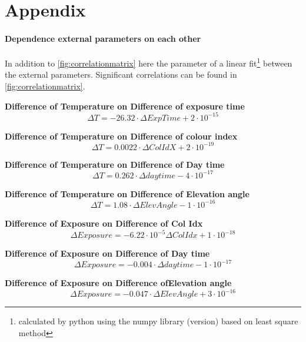 \documentclass  [
  paper    = a4,
  BCOR     = 10mm,
  twoside,
  fontsize = 12pt,
  fleqn,
  toc      = bibnumbered,
  toc      = listofnumbered,
  numbers  = noendperiod,
  headings = normal,
  listof   = leveldown,
  version  = 3.03
]                                       {scrreprt}
\begin{document}
\part{Appendix}
\begin{appendix}
	\subsection*{Dependence external parameters on each other}
	In addition to \cref{fig:correlationmatrix} here the parameter of a linear fit\footnote{calculated by python using the numpy library (version) based on least square method} between the external parameters. Significant correlations can be found in \cref{fig:correlationmatrix}.
	
	\textbf{Difference of Temperature on  Difference of exposure time}
	\begin{equation}
	\Delta T =  -26.32\cdot \Delta ExpTime + 2\cdot 10^{-15}
	\end{equation}
	
	\textbf{Difference of Temperature on  Difference of colour index}
	\begin{equation}
	\Delta T = 0.0022\cdot \Delta ColIdX +2\cdot 10^{-19}
	\end{equation}
	
	\textbf{Difference of Temperature on  Difference of Day time}
	\begin{equation}
	\Delta T =0.262\cdot \Delta daytime -4\cdot 10^{-17}
	\end{equation}
	
	\textbf{Difference of Temperature on  Difference of Elevation angle}
	\begin{equation}
	\Delta T =1.08\cdot \Delta Elev Angle -1\cdot 10^{-16}
	\end{equation}
	
	\textbf{Difference of Exposure on  Difference of  Col Idx}
	\begin{equation}
	\Delta Exposure  =-6.22\cdot 10^{-5} \Delta Col Idx  +1\cdot 10^{-18}
	\end{equation}
	
	\textbf{Difference of  Exposure on  Difference of Day time}
	\begin{equation}
	\Delta Exposure  =-0.004\cdot \Delta daytime -1\cdot 10^{-17}
	\end{equation}
	
	\textbf{Difference of  Exposure  on  Difference ofElevation angle}
	\begin{equation}
	\Delta Exposure  =-0.047\cdot \Delta  ElevAngle +3\cdot 10^{-16}
	\end{equation}
	

\end{appendix}
\end{document}
